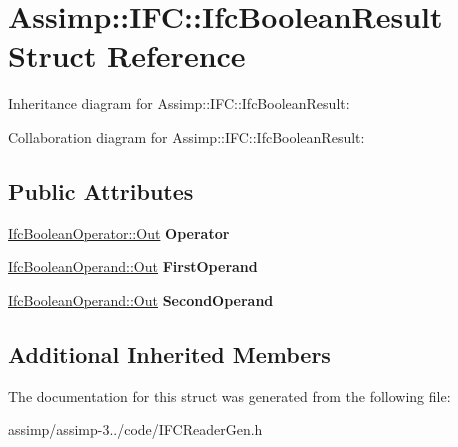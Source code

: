 \hypertarget{struct_assimp_1_1_i_f_c_1_1_ifc_boolean_result}{\section{Assimp\+:\+:I\+F\+C\+:\+:Ifc\+Boolean\+Result Struct Reference}
\label{struct_assimp_1_1_i_f_c_1_1_ifc_boolean_result}
}


Inheritance diagram for Assimp\+:\+:I\+F\+C\+:\+:Ifc\+Boolean\+Result\+:


Collaboration diagram for Assimp\+:\+:I\+F\+C\+:\+:Ifc\+Boolean\+Result\+:
\subsection*{Public Attributes}
\begin{DoxyCompactItemize}
\item 
\hypertarget{struct_assimp_1_1_i_f_c_1_1_ifc_boolean_result_a417a0b7a9cb32f90a70d603b9db19e39}{\hyperlink{classboost_1_1shared__ptr}{Ifc\+Boolean\+Operator\+::\+Out} {\bfseries Operator}}\label{struct_assimp_1_1_i_f_c_1_1_ifc_boolean_result_a417a0b7a9cb32f90a70d603b9db19e39}

\item 
\hypertarget{struct_assimp_1_1_i_f_c_1_1_ifc_boolean_result_a608865a13dc82eb184004da060306267}{\hyperlink{classboost_1_1shared__ptr}{Ifc\+Boolean\+Operand\+::\+Out} {\bfseries First\+Operand}}\label{struct_assimp_1_1_i_f_c_1_1_ifc_boolean_result_a608865a13dc82eb184004da060306267}

\item 
\hypertarget{struct_assimp_1_1_i_f_c_1_1_ifc_boolean_result_aa7f7b67d0db5d10808dbae1411dacfcf}{\hyperlink{classboost_1_1shared__ptr}{Ifc\+Boolean\+Operand\+::\+Out} {\bfseries Second\+Operand}}\label{struct_assimp_1_1_i_f_c_1_1_ifc_boolean_result_aa7f7b67d0db5d10808dbae1411dacfcf}

\end{DoxyCompactItemize}
\subsection*{Additional Inherited Members}


The documentation for this struct was generated from the following file\+:\begin{DoxyCompactItemize}
\item 
assimp/assimp-\/3../code/I\+F\+C\+Reader\+Gen.\+h\end{DoxyCompactItemize}
